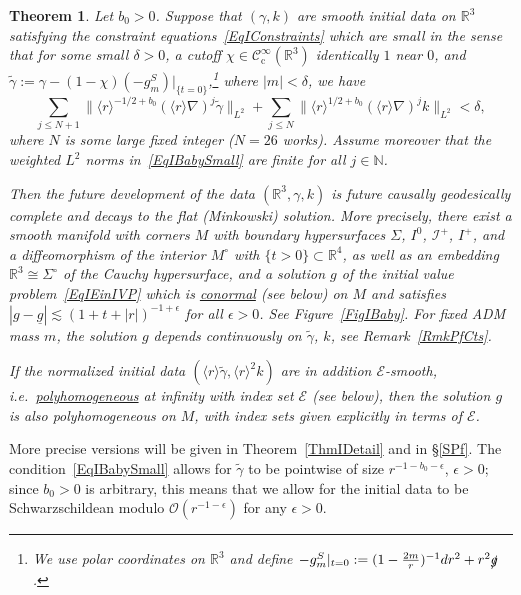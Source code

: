 \documentclass[reqno,11pt,letterpaper]{amsart}
\numberwithin{equation}{section}
\numberwithin{figure}{section}
\newtheorem{thm}{Theorem}[section]
\theoremstyle{definition}
\theoremstyle{remark}
\newcommand{\mc}{\mathcal}
\newcommand{\cC}{\mc C}
\newcommand{\cE}{\mc E}
\newcommand{\cO}{\mc O}
\newcommand{\ms}{\mathscr}
\newcommand{\scri}{\ms I}
\newcommand{\N}{\mathbb{N}}
\newcommand{\R}{\mathbb{R}}
\newcommand{\slg}{\slashed{g}{}}
\newcommand{\eps}{\epsilon}
\newcommand{\la}{\langle}
\newcommand{\ra}{\rangle}
\newcommand{\ul}[1]{\underline{#1}{}}
\newcommand{\wt}{\widetilde}
\newcommand{\cp}{{\mathrm{c}}}
\newcommand{\CIc}{\cC^\infty_\cp}
\newcommand{\usref}[1]{{\upshape\ref{#1}}}
\begin{document}
\begin{thm}
\label{ThmIBaby}
  Let $b_0>0$. Suppose that $(\gamma,k)$ are smooth initial data on $\R^3$ satisfying the constraint equations~\eqref{EqIConstraints} which are small in the sense that for some small $\delta>0$, a cutoff $\chi\in\CIc(\R^3)$ identically $1$ near $0$, and $\wt\gamma:=\gamma-(1-\chi)(-g_m^S)|_{\{t=0\}}$,\footnote{We use polar coordinates on $\R^3$ and define $-g^S_m|_{t=0}:=(1-\frac{2 m}{r})^{-1}d r^2+r^2\slg$.} where $|m|<\delta$, we have
  \begin{equation}
  \label{EqIBabySmall}
    \sum_{j\leq N+1} \| \la r\ra^{-1/2+b_0} (\la r\ra\nabla)^j \wt\gamma \|_{L^2} + \sum_{j\leq N} \| \la r\ra^{1/2+b_0} (\la r\ra\nabla)^j k \|_{L^2} < \delta,
  \end{equation}
  where $N$ is some large fixed integer ($N=26$ works). Assume moreover that the weighted $L^2$ norms in~\eqref{EqIBabySmall} are finite for all $j\in\N$.

  Then the future development of the data $(\R^3,\gamma,k)$ is future causally geodesically complete and decays to the flat (Minkowski) solution. More precisely, there exist a smooth manifold with corners $M$ with boundary hypersurfaces $\Sigma$, $I^0$, $\scri^+$, $I^+$, and a diffeomorphism of the interior $M^\circ$ with $\{t>0\}\subset\R^4$, as well as an embedding $\R^3\cong\Sigma^\circ$ of the Cauchy hypersurface, and a solution $g$ of the initial value problem~\eqref{EqIEinIVP} which is \ul{conormal} (see below) on $M$ and satisfies $|g-\ul g|\lesssim (1+t+|r|)^{-1+\eps}$ for all $\eps>0$. See Figure~\usref{FigIBaby}. For fixed ADM mass $m$, the solution $g$ depends continuously on $\wt\gamma$, $k$, see Remark~\usref{RmkPfCts}.

  If the normalized initial data $(\la r\ra\wt\gamma,\la r\ra^2 k)$ are in addition $\cE$-smooth, i.e.\ \ul{polyhomogeneous} at infinity with index set $\cE$ (see below), then the solution $g$ is also polyhomogeneous on $M$, with index sets given explicitly in terms of $\cE$.
\end{thm}

More precise versions will be given in Theorem~\ref{ThmIDetail} and in \S\ref{SPf}. The condition~\eqref{EqIBabySmall} allows for $\wt\gamma$ to be pointwise of size $r^{-1-b_0-\eps}$, $\eps>0$; since $b_0>0$ is arbitrary, this means that we allow for the initial data to be Schwarzschildean modulo $\cO(r^{-1-\eps})$ for any $\eps>0$.
\end{document}
